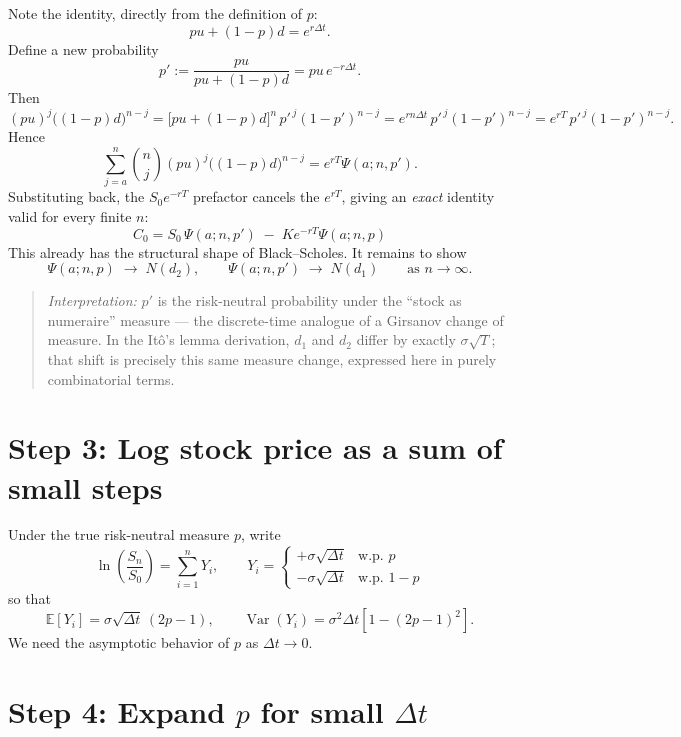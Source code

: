 \documentclass[11pt]{article}
\begin{document}
Note the identity, directly from the definition of $p$:
\[
  pu + (1-p)d = e^{r\Delta t}.
\]
Define a new probability
\[
  p' := \frac{pu}{pu + (1-p)d} = pu\, e^{-r\Delta t}.
\]
Then
\[
  (pu)^j \big((1-p)d\big)^{n-j}
  = \big[pu + (1-p)d\big]^n \, p'^{\,j} (1-p')^{n-j}
  = e^{r n \Delta t} \, p'^{\,j} (1-p')^{n-j}
  = e^{rT} \, p'^{\,j} (1-p')^{n-j}.
\]
Hence
\[
  \sum_{j=a}^{n} \binom{n}{j} (pu)^j \big((1-p)d\big)^{n-j} = e^{rT} \Psi(a; n, p').
\]
Substituting back, the $S_0 e^{-rT}$ prefactor cancels the $e^{rT}$, giving an
\emph{exact} identity valid for every finite $n$:
\[
  \boxed{\; C_0 = S_0\, \Psi(a; n, p') \;-\; K e^{-rT} \Psi(a; n, p) \;}
\]
This already has the structural shape of Black--Scholes. It remains to show
\[
  \Psi(a; n, p) \;\longrightarrow\; N(d_2), \qquad
  \Psi(a; n, p') \;\longrightarrow\; N(d_1)
  \qquad \text{as } n \to \infty.
\]

\begin{quote}
\emph{Interpretation:} $p'$ is the risk-neutral probability under the
``stock as numeraire'' measure --- the discrete-time analogue of a Girsanov change of
measure. In the It\^o's lemma derivation, $d_1$ and $d_2$ differ by exactly
$\sigma\sqrt{T}$; that shift is precisely this same measure change, expressed here in
purely combinatorial terms.
\end{quote}

\section*{Step 3: Log stock price as a sum of small steps}

Under the true risk-neutral measure $p$, write
\[
  \ln\!\left(\frac{S_n}{S_0}\right) = \sum_{i=1}^n Y_i,
  \qquad
  Y_i =
  \begin{cases}
    +\sigma\sqrt{\Delta t} & \text{w.p. } p \\
    -\sigma\sqrt{\Delta t} & \text{w.p. } 1-p
  \end{cases}
\]
so that
\[
  \mathbb{E}[Y_i] = \sigma\sqrt{\Delta t}\,(2p-1), \qquad
  \operatorname{Var}(Y_i) = \sigma^2 \Delta t \left[1 - (2p-1)^2\right].
\]
We need the asymptotic behavior of $p$ as $\Delta t \to 0$.

\section*{Step 4: Expand $p$ for small $\Delta t$}
\end{document}
